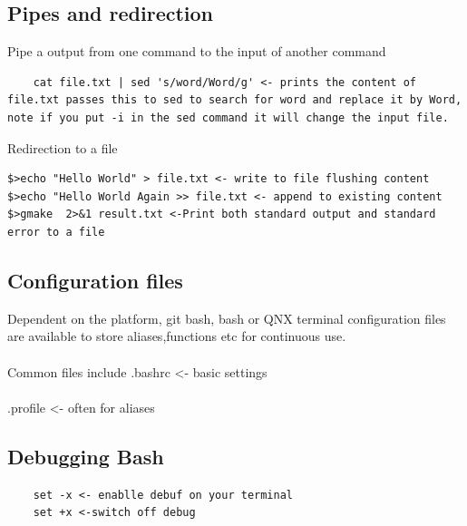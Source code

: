 \documentclass[22pt] {article}
\begin{document}
\subsection{Pipes and redirection}
Pipe a output from one command to the input of another command
\begin{lstlisting}
	cat file.txt | sed 's/word/Word/g' <- prints the content of file.txt passes this to sed to search for word and replace it by Word, note if you put -i in the sed command it will change the input file.   
\end{lstlisting}
Redirection to a file
\begin{lstlisting}
$>echo "Hello World" > file.txt <- write to file flushing content
$>echo "Hello World Again >> file.txt <- append to existing content
$>gmake  2>&1 result.txt <-Print both standard output and standard error to a file
 \end{lstlisting}
 
 
\subsection{Configuration files}
Dependent on the platform, git bash, bash or QNX terminal configuration files are available to store aliases,functions etc for continuous use.
\paragraph{}
Common files include .bashrc <- basic settings
\paragraph{}
												 .profile <- often for aliases
\subsection{Debugging Bash }
\begin{lstlisting}
	set -x <- enablle debuf on your terminal
	set +x <-switch off debug
\end{lstlisting}	
\end{document}
